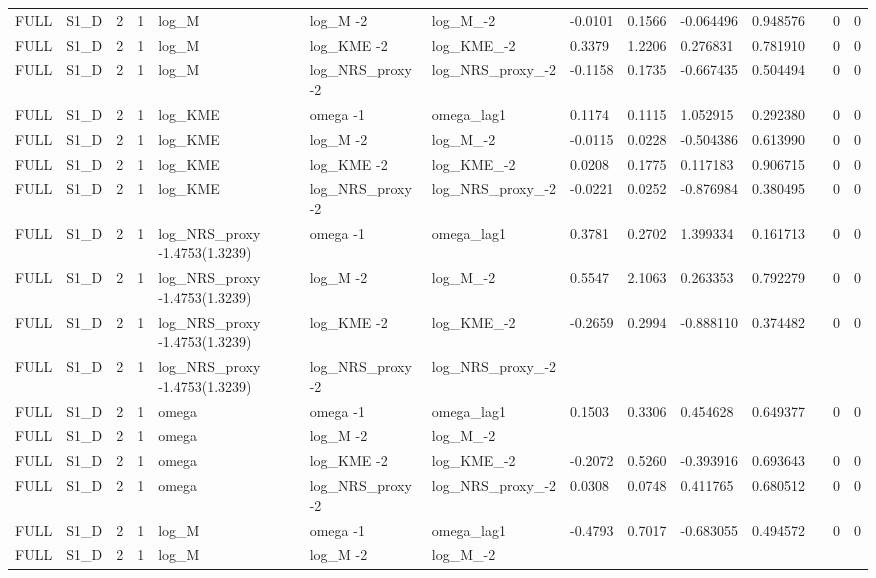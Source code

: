 \begin{tabular}{llllllllllllll}
FULL & S1\_D & 2 & 1 & log\_M & log\_M -2 & log\_M\_-2 & -0.0101 & 0.1566 & -0.064496 & 0.948576 &  & 0 & 0 \\
FULL & S1\_D & 2 & 1 & log\_M & log\_KME -2 & log\_KME\_-2 & 0.3379 & 1.2206 & 0.276831 & 0.781910 &  & 0 & 0 \\
FULL & S1\_D & 2 & 1 & log\_M & log\_NRS\_proxy -2 & log\_NRS\_proxy\_-2 & -0.1158 & 0.1735 & -0.667435 & 0.504494 &  & 0 & 0 \\
FULL & S1\_D & 2 & 1 & log\_KME & omega -1 & omega\_lag1 & 0.1174 & 0.1115 & 1.052915 & 0.292380 &  & 0 & 0 \\
FULL & S1\_D & 2 & 1 & log\_KME & log\_M -2 & log\_M\_-2 & -0.0115 & 0.0228 & -0.504386 & 0.613990 &  & 0 & 0 \\
FULL & S1\_D & 2 & 1 & log\_KME & log\_KME -2 & log\_KME\_-2 & 0.0208 & 0.1775 & 0.117183 & 0.906715 &  & 0 & 0 \\
FULL & S1\_D & 2 & 1 & log\_KME & log\_NRS\_proxy -2 & log\_NRS\_proxy\_-2 & -0.0221 & 0.0252 & -0.876984 & 0.380495 &  & 0 & 0 \\
FULL & S1\_D & 2 & 1 & log\_NRS\_proxy -1.4753(1.3239) & omega -1 & omega\_lag1 & 0.3781 & 0.2702 & 1.399334 & 0.161713 &  & 0 & 0 \\
FULL & S1\_D & 2 & 1 & log\_NRS\_proxy -1.4753(1.3239) & log\_M -2 & log\_M\_-2 & 0.5547 & 2.1063 & 0.263353 & 0.792279 &  & 0 & 0 \\
FULL & S1\_D & 2 & 1 & log\_NRS\_proxy -1.4753(1.3239) & log\_KME -2 & log\_KME\_-2 & -0.2659 & 0.2994 & -0.888110 & 0.374482 &  & 0 & 0 \\
FULL & S1\_D & 2 & 1 & log\_NRS\_proxy -1.4753(1.3239) & log\_NRS\_proxy -2 & log\_NRS\_proxy\_-2 &  &  &  &  &  &  &  \\
FULL & S1\_D & 2 & 1 & omega & omega -1 & omega\_lag1 & 0.1503 & 0.3306 & 0.454628 & 0.649377 &  & 0 & 0 \\
FULL & S1\_D & 2 & 1 & omega & log\_M -2 & log\_M\_-2 &  &  &  &  &  &  &  \\
FULL & S1\_D & 2 & 1 & omega & log\_KME -2 & log\_KME\_-2 & -0.2072 & 0.5260 & -0.393916 & 0.693643 &  & 0 & 0 \\
FULL & S1\_D & 2 & 1 & omega & log\_NRS\_proxy -2 & log\_NRS\_proxy\_-2 & 0.0308 & 0.0748 & 0.411765 & 0.680512 &  & 0 & 0 \\
FULL & S1\_D & 2 & 1 & log\_M & omega -1 & omega\_lag1 & -0.4793 & 0.7017 & -0.683055 & 0.494572 &  & 0 & 0 \\
FULL & S1\_D & 2 & 1 & log\_M & log\_M -2 & log\_M\_-2 &  &  &  &  &  &  &  \\

\end{tabular}
